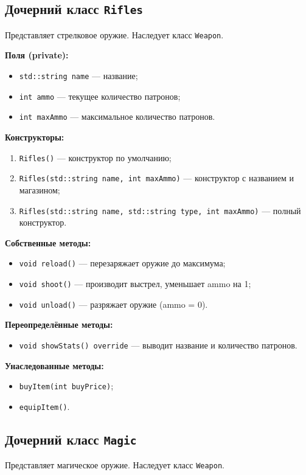 \documentclass[oneside,a4paper,14pt]{extarticle}
\begin{document}
\subsection*{Дочерний класс \texttt{Rifles}}
Представляет стрелковое оружие. Наследует класс \texttt{Weapon}.

\textbf{Поля (private):}
\begin{itemize}
    \item \texttt{std::string name} — название;
    \item \texttt{int ammo} — текущее количество патронов;
    \item \texttt{int maxAmmo} — максимальное количество патронов.
\end{itemize}

\textbf{Конструкторы:}
\begin{enumerate}
    \item \texttt{Rifles()} — конструктор по умолчанию;
    \item \texttt{Rifles(std::string name, int maxAmmo)} — конструктор с названием и магазином;
    \item \texttt{Rifles(std::string name, std::string type, int maxAmmo)} — полный конструктор.
\end{enumerate}

\textbf{Собственные методы:}
\begin{itemize}
    \item \texttt{void reload()} — перезаряжает оружие до максимума;
    \item \texttt{void shoot()} — производит выстрел, уменьшает ammo на 1;
    \item \texttt{void unload()} — разряжает оружие (ammo = 0).
\end{itemize}

\textbf{Переопределённые методы:}
\begin{itemize}
    \item \texttt{void showStats() override} — выводит название и количество патронов.
\end{itemize}

\textbf{Унаследованные методы:}
\begin{itemize}
    \item \texttt{buyItem(int buyPrice)};
    \item \texttt{equipItem()}.
\end{itemize}

\subsection*{Дочерний класс \texttt{Magic}}
Представляет магическое оружие. Наследует класс \texttt{Weapon}.
\end{document}
